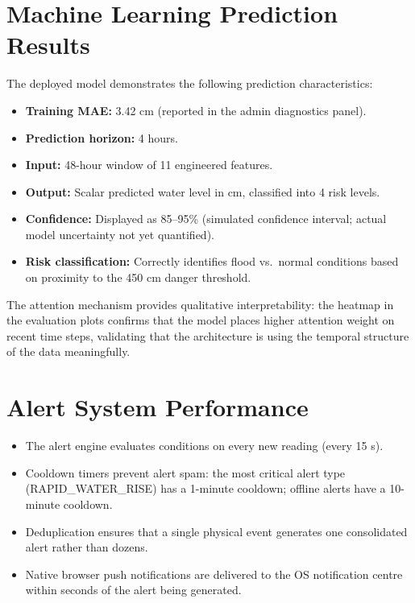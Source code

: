 \section{Machine Learning Prediction Results}

The deployed model demonstrates the following prediction characteristics:

\begin{itemize}[leftmargin=1.5em]
  \item \textbf{Training MAE:} 3.42 cm (reported in the admin diagnostics panel).
  \item \textbf{Prediction horizon:} 4 hours.
  \item \textbf{Input:} 48-hour window of 11 engineered features.
  \item \textbf{Output:} Scalar predicted water level in cm, classified into 4 risk levels.
  \item \textbf{Confidence:} Displayed as 85--95\% (simulated confidence interval; actual model uncertainty not yet quantified).
  \item \textbf{Risk classification:} Correctly identifies flood vs.\ normal conditions based on proximity to the 450 cm danger threshold.
\end{itemize}

The attention mechanism provides qualitative interpretability: the heatmap in the evaluation plots confirms that the model places higher attention weight on recent time steps, validating that the architecture is using the temporal structure of the data meaningfully.

\section{Alert System Performance}

\begin{itemize}[leftmargin=1.5em]
  \item The alert engine evaluates conditions on every new reading (every 15 s).
  \item Cooldown timers prevent alert spam: the most critical alert type (RAPID\_WATER\_RISE) has a 1-minute cooldown; offline alerts have a 10-minute cooldown.
  \item Deduplication ensures that a single physical event generates one consolidated alert rather than dozens.
  \item Native browser push notifications are delivered to the OS notification centre within seconds of the alert being generated.
\end{itemize}

